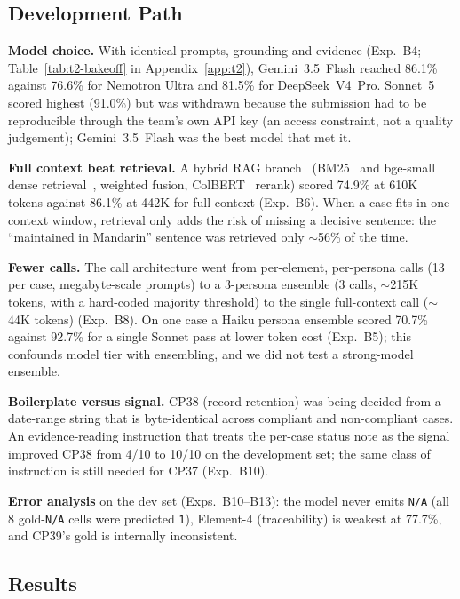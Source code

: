 \subsection{Development Path}
\label{sec:t2-experiments}


\noindent\textbf{Model choice.} With identical prompts, grounding and evidence
(Exp.~B4; Table~\ref{tab:t2-bakeoff} in Appendix~\ref{app:t2}), Gemini~3.5~Flash
reached 86.1\% against 76.6\% for Nemotron Ultra and 81.5\% for DeepSeek~V4~Pro.
Sonnet~5 scored highest (91.0\%) but was withdrawn
because the submission had to be reproducible through the team's own API key (an
access constraint, not a quality judgement); Gemini~3.5~Flash was the best model that
met it.

\noindent\textbf{Full context beat retrieval.} A hybrid RAG
branch~\cite{lewis2020rag} (BM25~\cite{robertson2009bm25} and bge-small dense
retrieval~\cite{xiao2024bge}, weighted fusion, ColBERT~\cite{khattab2020colbert}
rerank) scored 74.9\% at 610K tokens against 86.1\% at 442K for full context
(Exp.~B6). When a case fits in one
context window, retrieval only adds the risk of missing a decisive sentence: the
``maintained in Mandarin'' sentence was retrieved only $\sim$56\% of the time.

\noindent\textbf{Fewer calls.} The call architecture went from per-element,
per-persona calls (13 per case, megabyte-scale prompts) to a 3-persona ensemble
(3 calls, $\sim$215K tokens, with a hard-coded majority threshold) to the single
full-context call ($\sim$44K tokens) (Exp.~B8). On one case a Haiku persona ensemble
scored 70.7\% against 92.7\% for a single Sonnet pass at lower token cost (Exp.~B5);
this confounds model tier with ensembling, and we did not test a strong-model ensemble.

\noindent\textbf{Boilerplate versus signal.} CP38 (record retention) was being decided
from a date-range string that is byte-identical across compliant and non-compliant
cases. An evidence-reading instruction that treats the per-case status note as the
signal improved CP38 from 4/10 to 10/10 on the development set; the same class of
instruction is still needed for CP37 (Exp.~B10).

\noindent\textbf{Error analysis} on the dev set (Exps.~B10--B13): the model never emits
\texttt{N/A} (all 8 gold-\texttt{N/A} cells were predicted \texttt{1}), Element-4
(traceability) is weakest at 77.7\%, and CP39's gold is internally inconsistent.

\subsection{Results}
\label{sec:t2-results}

